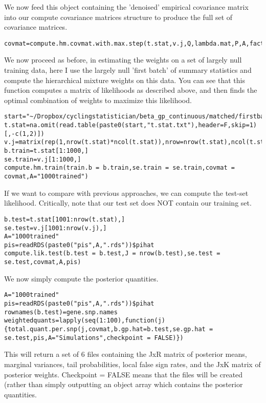 \documentclass[10pt]{article}
\begin{document}
We now feed this object containing the 'denoised' empirical covariance matrix into our compute covariance matrices structure to produce the full set of covariance matrices.

\begin{verbatim}
covmat=compute.hm.covmat.with.max.step(t.stat,v.j,Q,lambda.mat,P,A,factor.mat,max.step=s)
\end{verbatim}    

We now proceed as before, in estimating the weights on a set of largely null training data, here I use the largely null 'first batch' of summary statistics and compute the hierarchical mixture weights on this data. You can see that this function computes a matrix of likelihoods as described above, and then finds the optimal combination of weights to maximize this likelihood.


\begin{verbatim}
start="~/Dropbox/cyclingstatistician/beta_gp_continuous/matched/firstbatch"
t.stat=na.omit(read.table(paste0(start,"t.stat.txt"),header=F,skip=1)[,-c(1,2)])
v.j=matrix(rep(1,nrow(t.stat)*ncol(t.stat)),nrow=nrow(t.stat),ncol(t.stat))
b.train=t.stat[1:1000,]
se.train=v.j[1:1000,]
compute.hm.train(train.b = b.train,se.train = se.train,covmat = covmat,A="1000trained")
\end{verbatim}   


If we want to compare with previous approaches, we can compute the test-set likelihood. Critically, note that our test set does NOT contain our training set.

\begin{verbatim}
b.test=t.stat[1001:nrow(t.stat),]
se.test=v.j[1001:nrow(v.j),]
A="1000trained"
pis=readRDS(paste0("pis",A,".rds"))$pihat
compute.lik.test(b.test = b.test,J = nrow(b.test),se.test = se.test,covmat,A,pis)
\end{verbatim}  

We now simply compute the posterior quantities. 

\begin{verbatim}
A="1000trained"
pis=readRDS(paste0("pis",A,".rds"))$pihat
rownames(b.test)=gene.snp.names
weightedquants=lapply(seq(1:100),function(j){total.quant.per.snp(j,covmat,b.gp.hat=b.test,se.gp.hat = se.test,pis,A="Simulations",checkpoint = FALSE)})
\end{verbatim}

This will return a set of 6 files containing the JxR matrix of posterior means, marginal variances, tail probabilities, local false sign rates, and the JxK matrix of posterior weights. Checkpoint = FALSE means that the files will be created (rather than simply outputting an object array which contains the posterior quantities.
\end{document}
